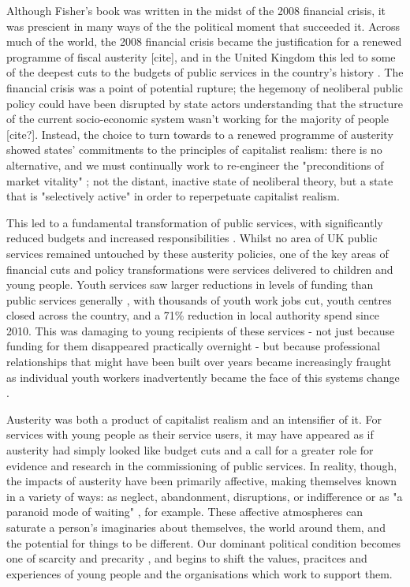 Although Fisher's book was written in the midst of the 2008 financial crisis, it was prescient in many ways of the the political moment that succeeded it. Across much of the world, the 2008 financial crisis became the justification for a renewed programme of fiscal austerity [cite], and in the United Kingdom this led to some of the deepest cuts to the budgets of public services in the country's history \citep{lowndes_local_2012}. The financial crisis was a point of potential rupture; the hegemony of neoliberal public policy could have been disrupted by state actors understanding that the structure of the current socio-economic system wasn't working for the majority of people [cite?]. Instead, the choice to turn towards to a renewed programme of austerity showed states' commitments to the principles of capitalist realism: there is no alternative, and we must continually work to re-engineer the "preconditions of market vitality" \citep{connolly_fragility_2013}; not the distant, inactive state of neoliberal theory, but a state that is "selectively active" \citep{harvey_brief_2007} in order to reperpetuate capitalist realism.

This led to a fundamental transformation of public services, with significantly reduced budgets and  increased responsibilities \citep{clifford_charitable_2017, jones_uneven_2016}. Whilst no area of UK public services remained untouched by these austerity policies, one of the key areas of financial cuts and policy transformations were services delivered to children and young people. Youth services saw larger reductions in levels of funding than public services generally \citep{youdell_assembling_2015}, with thousands of youth work jobs cut, youth centres closed across the country, and a 71\% reduction in local authority spend since 2010. %
This was damaging to young recipients of these services - not just because funding for them disappeared practically overnight - but because professional relationships that might have been built over years became increasingly fraught as individual youth workers inadvertently became the face of this systems change \citep{clayton_distancing_2016}. 

Austerity was both a product of capitalist realism and an intensifier of it. For services with young people as their service users, it may have appeared as if austerity had simply looked like budget cuts and a call for a greater role for evidence and research in the commissioning of public services. In reality, though, the impacts of austerity have been primarily affective, making themselves known in a variety of ways: as neglect, abandonment, disruptions, or indifference  \citep{raynor_dramatising_2017} or as "a paranoid mode of waiting" \citep{hitchen_affective_2019}, for example. These affective atmospheres can saturate a person's imaginaries about themselves, the world around them, and the potential for things to be different. Our dominant political condition becomes one of scarcity and precarity \citep{berlant_cruel_2011}, and begins to shift the values, pracitces and experiences of young people and the organisations which work to support them. 

